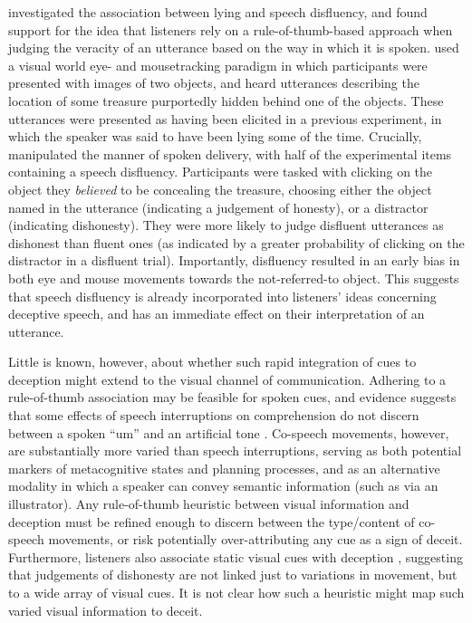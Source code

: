 \documentclass[a4paper,man,natbib]{apa6}
\newcommand*{\spex}[1]{``{#1}''} %
\begin{document}
\citet{Loy2017} investigated the association between lying and speech disfluency, and found support for the idea that listeners rely on a rule-of-thumb-based approach when judging the veracity of an utterance based on the way in which it is spoken.
\citeauthor{Loy2017} used a visual world eye- and mousetracking paradigm in which participants were presented with images of two objects, and heard utterances describing the location of some treasure purportedly hidden behind one of the objects.
These utterances were presented as having been elicited in a previous experiment, in which the speaker was said to have been lying some of the time.
Crucially, \citet{Loy2017} manipulated the manner of spoken delivery, with half of the experimental items containing a speech disfluency.
Participants were tasked with clicking on the object they \textit{believed} to be concealing the treasure, choosing either the object named in the utterance (indicating a judgement of honesty), or a distractor (indicating dishonesty).
They were more likely to judge disfluent utterances as dishonest than fluent ones (as indicated by a greater probability of clicking on the distractor in a disfluent trial). 
Importantly, disfluency resulted in an early bias in both eye and mouse movements towards the not-referred-to object.
This suggests that speech disfluency is already incorporated into listeners' ideas concerning deceptive speech, and has an immediate effect on their interpretation of an utterance. 


Little is known, however, about whether such rapid integration of cues to deception might extend to the visual channel of communication. 
Adhering to a rule-of-thumb association may be feasible for spoken cues, and evidence suggests that some effects of speech interruptions on comprehension do not discern between a spoken \spex{um} and an artificial tone \citep{Corley2011}.
Co-speech movements, however, are substantially more varied than speech interruptions, serving as both potential markers of metacognitive states and planning processes, and as an alternative modality in which a speaker can convey semantic information (such as via an illustrator).
Any rule-of-thumb heuristic between visual information and deception must be refined enough to discern between the type/content of co-speech movements, or risk potentially over-attributing any cue as a sign of deceit.
Furthermore, listeners also associate static visual cues with deception \citep[e.g. eye-gaze,][]{Zuckerman1981a}, suggesting that judgements of dishonesty are not linked just to variations in movement, but to a wide array of visual cues. 
It is not clear how such a heuristic might map such varied visual information to deceit.
\end{document}
